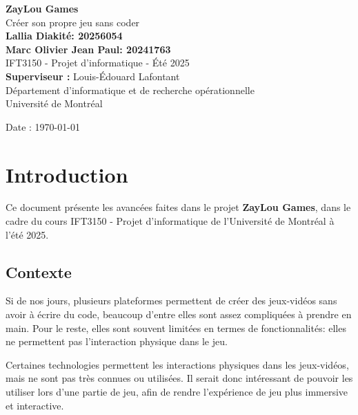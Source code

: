 \documentclass[12pt]{article}        %
\begin{document}

\begin{titlepage}
    \centering

    \Huge\textbf{ZayLou Games}\\
    \LARGE Créer son propre jeu sans coder\\[2cm]

    \textbf{Lallia Diakité: 20256054 \\
     Marc Olivier Jean Paul: 20241763} \\[2cm]

    IFT3150 - Projet d'informatique - Été 2025\\[2cm]

    \textbf{Superviseur :} Louis-Édouard Lafontant\\[2cm]

    Département d’informatique et de recherche opérationnelle\\[1cm] 
    Université de Montréal\\[1cm]

    \vfill

    {\large Date : \today}
\end{titlepage}

\tableofcontents                    %
\newpage                            %


\section{Introduction}              
\label{sec:introduction}       
Ce document présente les avancées faites dans le projet \textbf{ZayLou 
Games}, dans le cadre du cours IFT3150 - Projet d'informatique de 
l'Université de Montréal à l'été 2025.

\subsection{Contexte}               
\label{subsec:contexte}             
Si de nos jours, plusieurs plateformes permettent de créer des 
jeux-vidéos sans avoir à écrire du code, beaucoup d'entre elles sont 
assez compliquées à prendre en main. Pour le reste, elles sont souvent 
limitées en termes de fonctionnalités: elles ne permettent pas 
l'interaction physique dans le jeu.

Certaines technologies permettent les interactions physiques dans les 
jeux-vidéos, mais ne sont pas très connues ou utilisées. Il serait donc 
intéressant de pouvoir les utiliser lors d'une partie de jeu, afin de 
rendre l'expérience de jeu plus immersive et interactive.
\end{document}
